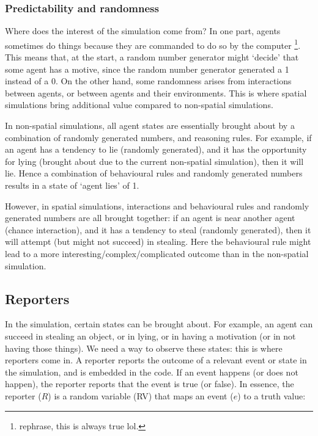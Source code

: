 \subsubsection{Predictability and randomness}
Where does the interest of the simulation come from? In one part, agents sometimes do things because they are commanded to do so by the computer \footnote{rephrase, this is always true lol.}. This means that, at the start, a random number generator might `decide' that some agent has a motive, since the random number generator generated a 1 instead of a 0. On the other hand, some randomness arises from interactions between agents, or between agents and their environments. This is where spatial simulations bring additional value compared to non-spatial simulations.

 In non-spatial simulations, all agent states are essentially brought about by a combination of randomly generated numbers, and reasoning rules. For example, if an agent has a tendency to lie (randomly generated), and it has the opportunity for lying (brought about due to the current non-spatial simulation), then it will lie. Hence a combination of behavioural rules and randomly generated numbers results in a state of `agent lies' of 1.
 
 However, in spatial simulations, interactions and behavioural rules and randomly generated numbers are all brought together: if an agent is near another agent (chance interaction), and it has a tendency to steal (randomly generated), then it will attempt (but might not succeed) in stealing. Here the behavioural rule might lead to a more interesting/complex/complicated outcome than in the non-spatial simulation.
 


\subsection{Reporters}

In the simulation, certain states can be brought about. For example, an agent can succeed in stealing an object, or in lying, or in having a motivation (or in not having those things). We need a way to observe these states: this is where reporters come in. A reporter reports the outcome of a relevant event or state in the simulation, and is embedded in the code. If an event happens (or does not happen), the reporter reports that the event is true (or false). In essence, the reporter ($R$) is a random variable (RV) that maps an event ($e$) to a truth value:


